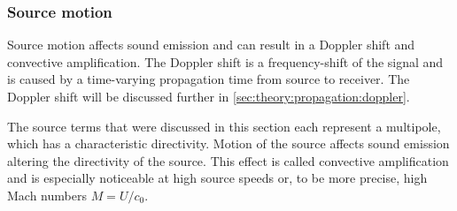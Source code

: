 \subsubsection{Source motion}
Source motion affects sound emission and can result in a Doppler shift and
convective amplification. The Doppler shift is a frequency-shift of the signal
and is caused by a time-varying propagation time from source to receiver. The
Doppler shift will be discussed further in \ref{sec:theory:propagation:doppler}.

The source terms that were discussed in this section each represent a multipole,
which has a characteristic directivity. Motion of the source affects sound
emission altering the directivity of the source. This effect is called
convective amplification and is especially noticeable at high source speeds or,
to be more precise, high Mach numbers $M=U/c_0$.

